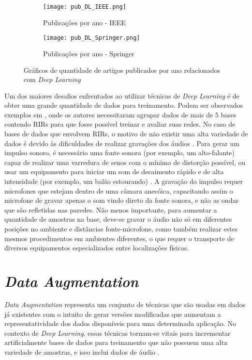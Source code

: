 \begin{figure} [H]
    \begin{subfigure}{1\textwidth}
        \centering
        \texttt{[image: pub\_DL\_IEEE.png]}
        \caption{Publicações por ano - IEEE}    
    \end{subfigure}
    \begin{subfigure}{1\textwidth}
        \centering
        \texttt{[image: pub\_DL\_Springer.png]}
        \caption{Publicações por ano - Springer\textregistered}    
    \end{subfigure}
    \caption{Gráficos de quantidade de artigos publicados por ano relacionados com \textit{Deep Learning}}
    \label{fig:pub_DL}
\end{figure}

Um dos maiores desafios enfrentados ao utilizar técnicas de \textit{Deep Learning} é de obter uma grande quantidade de dados para treinamento.
Podem ser observados exemplos em \cite{Estimation_RT_DRR,ACE_Data_Aug_Eval}, onde os autores necessitaram agrupar dados de mais de 5 bases contendo
RIRs para que fosse possível treinar e avaliar suas redes.
No caso de bases de dados que envolvem RIRs, o motivo de não existir uma alta variedade de dados é devido às dificuldades
de realizar gravações dos áudios \cite{Recording_RIR_2}.
Para gerar um impulso sonoro, é necessário uma fonte sonora (por exemplo, um alto-falante) capaz de realizar uma varredura de senos com o mínimo de distorção
possível, ou usar um equipamento para iniciar um som de decaimento rápido e de alta intensidade (por exemplo, um balão estourando) \cite{Recording_RIR}.
A gravação do impulso requer microfones que estejam dentro de uma câmara anecóica, capacitando assim o microfone de gravar apenas o som vindo direto
da fonte sonora, e não as ondas que são refletidas nas paredes.
Não menos importante, para aumentar a quantidade de amostras na base, deve-se gravar o áudio não só em diferentes posições no ambiente
e distâncias fonte-microfone, como também realizar estes mesmos procedimentos em ambientes diferentes, o que requer o transporte de diversos equipamentos
especializados entre localizações físicas.

\section{\textit{Data Augmentation}}

\textit{Data Augmentation} representa um conjunto de técnicas que são usadas em dados já existentes com o intuito de gerar versões
modificadas que aumentam a representatividade dos dados disponíveis para uma determinada aplicação. 
No contexto de \textit{Deep Learning}, essas técnicas tornam-se vitais para incrementar artificialmente bases de dados
para treinamento que não possuem uma alta variedade de amostras, e isso inclui dados de áudio \cite{DL_Data_Aug_sc,Metric_Data_Aug_sc}.

